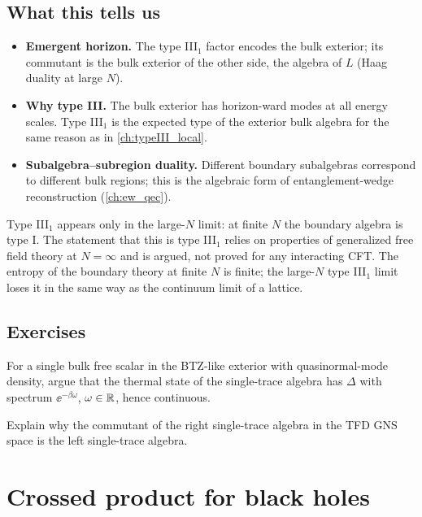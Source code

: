 \subsection{What this tells us}
\begin{itemize}
\item \textbf{Emergent horizon.} The type III$_1$ factor encodes the bulk exterior; its commutant is the bulk exterior of the other side, the algebra of $L$ (Haag duality at large $N$).
\item \textbf{Why type III.} The bulk exterior has horizon-ward modes at all energy scales. Type III$_1$ is the expected type of the exterior bulk algebra for the same reason as in \cref{ch:typeIII_local}.
\item \textbf{Subalgebra--subregion duality.} Different boundary subalgebras correspond to different bulk regions; this is the algebraic form of entanglement-wedge reconstruction (\cref{ch:ew_qec}).
\end{itemize}

\begin{whatwrong}
Type III$_1$ appears only in the large-$N$ limit: at finite $N$ the boundary algebra is type I. The statement that this is type III$_1$ relies on properties of generalized free field theory at $N=\infty$ and is argued, not proved for any interacting CFT. The entropy of the boundary theory at finite $N$ is finite; the large-$N$ type III$_1$ limit loses it in the same way as the continuum limit of a lattice.
\end{whatwrong}

\subsection*{Exercises}
\begin{exercise}\label{ex:large_N:1}
For a single bulk free scalar in the BTZ-like exterior with quasinormal-mode density, argue that the thermal state of the single-trace algebra has $\Delta$ with spectrum $\ee^{-\beta\omega}$, $\omega\in\mathbb{R}$, hence continuous.
\end{exercise}
\begin{exercise}\label{ex:large_N:2}
Explain why the commutant of the right single-trace algebra in the TFD GNS space is the left single-trace algebra.
\end{exercise}

\section{Crossed product for black holes}\label{ch:bh_crossed}
\skippable

